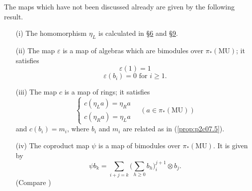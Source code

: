 \documentclass[../main]{subfiles}
\begin{document}
The maps which have not been discussed already are given by the following result. 
\begin{theorem}
\label{thm:p2c11.3}
\begin{enumerate}
    \item[(i)] The homomorphism $\eta_L$ is calculated in \hyperref[sec:p2c6]{\S 6} and \hyperref[sec:p2c9]{\S 9}.
    \item[(ii)] The map $\varepsilon$ is a map of algebras which are bimodules over $\pi_\ast(\mathrm{MU})$; it satisfies \[\varepsilon(1) = 1\] 
    \[\varepsilon(b_i) = 0 \text { for } i \ge 1.\]
    \item[(iii)] The map $c$ is a map of rings; it satisfies \[\begin{cases}c(\eta_L a) = \eta_R a \\ c(\eta_R a) = \eta_L a\end{cases} \quad (a \in \pi_\ast(\mathrm{MU}))\] and $c(b_i) = m_i$, where $b_i$ and $m_i$ are related as in (\ref{prop:p2c07.5}).
    \item[(iv)] The coproduct map $\psi$ is a map of bimodules over $\pi_\ast(\mathrm{MU})$. It is given by \[\displaystyle \psi b_k = \sum_{i + j = k} \bigg(\sum_{h \ge 0} b_h\bigg)_i^{j + 1} \otimes b_j.\] (Compare \cite[p.~20, Theorem 6.3]{adams2})
\end{enumerate}
\end{theorem}
\end{document}
